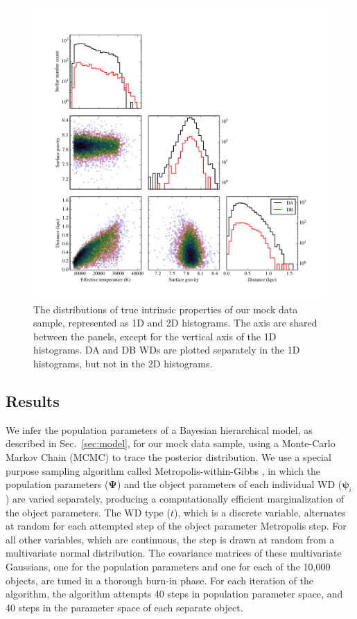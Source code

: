 \documentclass[fleqn,usenatbib]{mnras}
\newcommand{\popp}{\boldsymbol{\Psi}}
\newcommand{\objp}{\boldsymbol{\psi}}
\begin{document}
\begin{figure}
	\includegraphics[width=.9\textwidth]{10000WDs.pdf}
    \caption{The distributions of true intrinsic properties of our mock data sample, represented as 1D and 2D histograms. The axis are shared between the panels, except for the vertical axis of the 1D histograms. DA and DB WDs are plotted separately in the 1D histograms, but not in the 2D histograms.}
    \label{fig:10000WDs}
\end{figure}



\subsection{Results}

We infer the population parameters of a Bayesian hierarchical model, as described in Sec.~\ref{sec:model}, for our mock data sample, using a Monte-Carlo Markov Chain (MCMC) to trace the posterior distribution. We use a special purpose sampling algorithm called Metropolis-within-Gibbs \citep{BayesianDataAnalysis}, in which the population parameters ($\popp$) and the object parameters of each individual WD ($\objp_i$) are varied separately, producing a computationally efficient marginalization of the object parameters. The WD type ($t$), which is a discrete variable, alternates at random for each attempted step of the object parameter Metropolis step. For all other variables, which are continuous, the step is drawn at random from a multivariate normal distribution. The covariance matrices of these multivariate Gaussians, one for the population parameters and one for each of the 10,000 objects, are tuned in a thorough burn-in phase. For each iteration of the algorithm, the algorithm attempts 40 steps in population parameter space, and 40 steps in the parameter space of each separate object.
\end{document}

